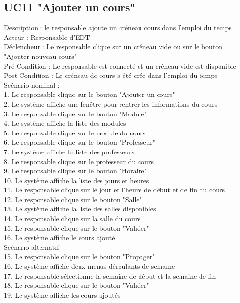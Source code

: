 \documentclass[a4paper,12pt]{article}
\begin{document}
\subsection{UC11 "Ajouter un cours"}
Description : le responsable ajoute un créneau cours dans l'emploi du temps\\
Acteur : Responsable d'EDT\\
Déclencheur : Le responsable clique sur un créneau vide ou sur le bouton "Ajouter nouveau cours"\\
Pré-Condition : Le responsable est connecté et un créneau vide est disponible\\
Post-Condition : Le créneau de cours a été crée dans l'emploi du temps\\

Scénario nominal : \\
1. Le responsable clique sur le bouton "Ajouter un cours"\\
2. Le système affiche une fenêtre pour rentrer les informations du cours\\
3. Le responsable clique sur le bouton "Module"\\
4. Le système affiche la liste des modules\\
5. Le responsable clique sur le module du cours\\
6. Le responsable clique sur le bouton "Professeur"\\
7. Le système affiche la liste des professeurs\\
8. Le responsable clique sur le professeur du cours\\
9. Le responsable clique sur le bouton "Horaire"\\
10. Le système affiche la liste des jours et heures\\
11. Le responsable clique sur le jour et l'heure de début et de fin du cours\\
12. Le responsable clique sur le bouton "Salle"\\
13. Le système affiche la liste des salles disponibles\\
14. Le responsable clique sur la salle du cours\\
15. Le responsable clique sur le bouton "Valider"\\
16. Le système affiche le cours ajouté\\

Scénario alternatif\\
15. Le responsable clique sur le bouton "Propager"\\
16. Le système affiche deux menus déroulants de semaine\\
17. Le responsable sélectionne la semaine de début et la semaine de fin\\
18. Le responsable clique sur le bouton "Valider"\\
19. Le système affiche les cours ajoutés\\
\end{document}
